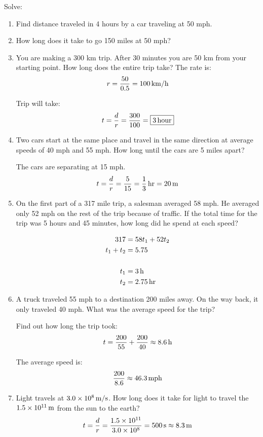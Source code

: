 \documentclass[letterpaper, landscape]{exam}
\begin{document}
  Solve:
  \begin{enumerate}
    \item Find distance traveled in 4 hours by a car traveling at 50 mph.

    \item How long does it take to go 150 miles at 50 mph?

    \item You are making a 300 km trip. After 30 minutes you are 50 km from your starting point. How long does the entire trip take?
      The rate is:
      \[
        r = \frac{50}{0.5} = \unit[100]{km/h}
      \]

      Trip will take:
      \[
        t = \frac{d}{r} = \frac{300}{100} = \boxed{ \unit[3]{hour} } 
      \]

    \item Two cars start at the same place and travel in the same direction at average speeds of 40
      mph and 55 mph. How long until the cars are 5 miles apart?

      The cars are separating at 15 mph.
      \[
        t = \frac{d}{r} = \frac{5}{15} = \unit[\frac{1}{3}]{hr} = \unit[20]{m}
      \]

    \item On the first part of a 317 mile trip, a salesman averaged 58 mph. He averaged only 52 mph
      on the rest of the trip because of traffic. If the total time for the trip was 5 hours and 45
      minutes, how long did he spend at each speed?

      \begin{align*}
        317       & = 58 t_1 + 52 t_2 \\
        t_1 + t_2 & = 5.75 \\
        \\
        t_1       & = \unit[3]{h} \\
        t_2       & = \unit[2.75]{hr}
      \end{align*}

    \item A truck traveled 55 mph to a destination 200 miles away. On the way back, it only traveled
      40 mph. What was the average speed for the trip?

      Find out how long the trip took:
      \[
        t = \frac{200}{55} + \frac{200}{40} \approx \unit[8.6]{h}
      \]

      The average speed is:
      \[
        \frac{200}{8.6} \approx \unit[46.3]{mph}
      \]

    \item Light travels at $\unit[3.0 \times 10^8]{m/s}$. How long does it take for light to travel
      the $\unit[1.5 \times 10^{11}]{m}$ from the sun to the earth?
      \[
        t = \frac{d}{r} = \frac{1.5 \times 10^{11}}{3.0 \times 10^8} = \unit[500]{s} \approx \unit[8.3]{m}
      \]


\end{enumerate}
\end{document}
